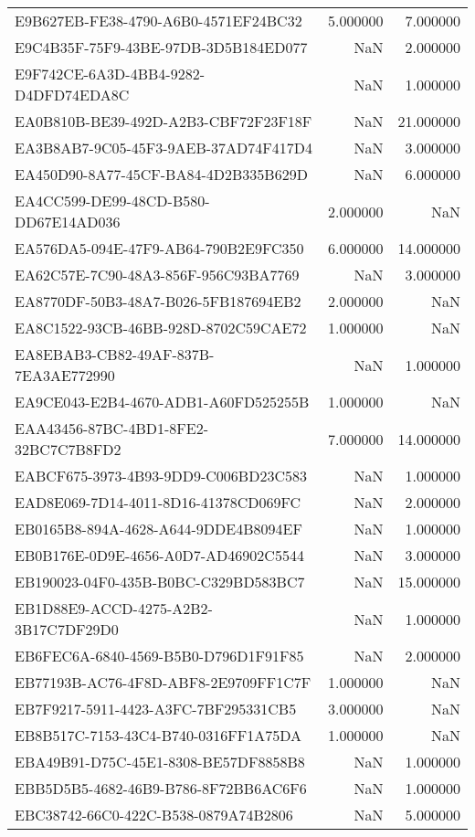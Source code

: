 \begin{tabular}{lrr}
E9B627EB-FE38-4790-A6B0-4571EF24BC32 & 5.000000 & 7.000000 \\
E9C4B35F-75F9-43BE-97DB-3D5B184ED077 & NaN & 2.000000 \\
E9F742CE-6A3D-4BB4-9282-D4DFD74EDA8C & NaN & 1.000000 \\
EA0B810B-BE39-492D-A2B3-CBF72F23F18F & NaN & 21.000000 \\
EA3B8AB7-9C05-45F3-9AEB-37AD74F417D4 & NaN & 3.000000 \\
EA450D90-8A77-45CF-BA84-4D2B335B629D & NaN & 6.000000 \\
EA4CC599-DE99-48CD-B580-DD67E14AD036 & 2.000000 & NaN \\
EA576DA5-094E-47F9-AB64-790B2E9FC350 & 6.000000 & 14.000000 \\
EA62C57E-7C90-48A3-856F-956C93BA7769 & NaN & 3.000000 \\
EA8770DF-50B3-48A7-B026-5FB187694EB2 & 2.000000 & NaN \\
EA8C1522-93CB-46BB-928D-8702C59CAE72 & 1.000000 & NaN \\
EA8EBAB3-CB82-49AF-837B-7EA3AE772990 & NaN & 1.000000 \\
EA9CE043-E2B4-4670-ADB1-A60FD525255B & 1.000000 & NaN \\
EAA43456-87BC-4BD1-8FE2-32BC7C7B8FD2 & 7.000000 & 14.000000 \\
EABCF675-3973-4B93-9DD9-C006BD23C583 & NaN & 1.000000 \\
EAD8E069-7D14-4011-8D16-41378CD069FC & NaN & 2.000000 \\
EB0165B8-894A-4628-A644-9DDE4B8094EF & NaN & 1.000000 \\
EB0B176E-0D9E-4656-A0D7-AD46902C5544 & NaN & 3.000000 \\
EB190023-04F0-435B-B0BC-C329BD583BC7 & NaN & 15.000000 \\
EB1D88E9-ACCD-4275-A2B2-3B17C7DF29D0 & NaN & 1.000000 \\
EB6FEC6A-6840-4569-B5B0-D796D1F91F85 & NaN & 2.000000 \\
EB77193B-AC76-4F8D-ABF8-2E9709FF1C7F & 1.000000 & NaN \\
EB7F9217-5911-4423-A3FC-7BF295331CB5 & 3.000000 & NaN \\
EB8B517C-7153-43C4-B740-0316FF1A75DA & 1.000000 & NaN \\
EBA49B91-D75C-45E1-8308-BE57DF8858B8 & NaN & 1.000000 \\
EBB5D5B5-4682-46B9-B786-8F72BB6AC6F6 & NaN & 1.000000 \\
EBC38742-66C0-422C-B538-0879A74B2806 & NaN & 5.000000 \\

\end{tabular}
